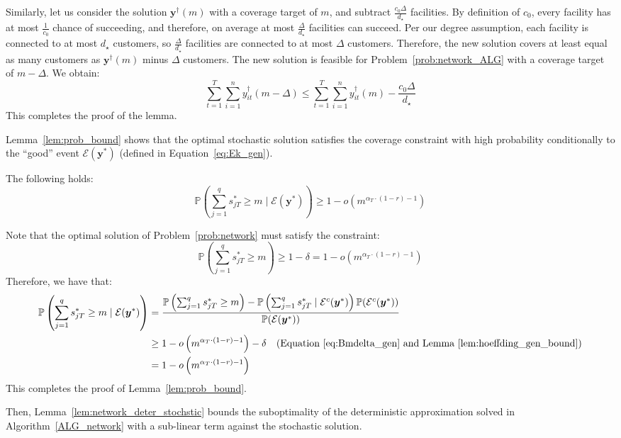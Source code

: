 \documentclass[nonblindrev]{informs3noheader}
\def\P{\mathbb{P}}
\def\calE{\mathcal{E}}
\def\by{\boldsymbol{y}}
\begin{document}
Similarly, let us consider the solution $\by^\dagger(m)$ with a coverage target of $m$, and subtract $\frac{c_0 \Delta}{d_\star}$ facilities. By definition of $c_0$, every facility has at most $\frac{1}{c_0}$ chance of succeeding, and therefore, on average at most $\frac{\Delta}{d_\star}$ facilities can succeed. Per our degree assumption, each facility is connected to at most $d_\star$ customers, so $\frac{\Delta}{d_\star}$ facilities are connected to at most $\Delta$ customers. Therefore, the new solution covers at least equal as many customers as $\by^\dagger(m)$ minus $\Delta$ customers. The new solution is feasible for Problem~\eqref{prob:network_ALG} with a coverage target of $m-\Delta$. We obtain:
\[\sum_{t=1}^T \sum_{i=1}^n y_{it}^\dagger(m-\Delta)\leq \sum_{t=1}^T \sum_{i=1}^n y_{it}^\dagger(m)-\frac{c_0 \Delta}{d_\star}\]
This completes the proof of the lemma.
\hfill\Halmos

Lemma~\ref{lem:prob_bound} shows that the optimal stochastic solution satisfies the coverage constraint with high probability conditionally to the ``good'' event $\calE(\by^*)$ (defined in Equation~\eqref{eq:Ek_gen}).

\begin{lemma}\label{lem:prob_bound}
   The following holds:
   \[\P\left(\sum_{j=1}^q s^*_{jT}\geq m\mid \calE(\by^*) \right)\geq 1-o\left(m^{\alpha_T\cdot(1-r)-1}\right)\]
\end{lemma}
Note that the optimal solution of Problem~\eqref{prob:network} must satisfy the constraint:
\begin{equation}
    \P\left(\sum_{j=1}^q s^*_{jT}\geq m\right)\geq 1-\delta = 1-o\left(m^{\alpha_T\cdot(1-r)-1}\right)\label{eq:Bmdelta_gen}
\end{equation}
Therefore, we have that:
\begin{align*}
    \P\left(\sum_{j=1}^q s^*_{jT} \geq m \mid \calE(\by^*)\right)
    &=\frac{\P\left(\sum_{j=1}^q s^*_{jT}\geq m\right)-\P\left(\sum_{j=1}^q s^*_{jT}\mid \calE^c(\by^*) \right)\P(\calE^c(\by^*))}{\P(\calE(\by^*))}\\
    &\geq1-o\left(m^{\alpha_T\cdot(1-r)-1}\right)-\delta\quad\text{(Equation~\eqref{eq:Bmdelta_gen} and Lemma~\ref{lem:hoeffding_gen_bound})}\\
    &=1-o\left(m^{\alpha_T\cdot(1-r)-1}\right)
\end{align*}
This completes the proof of Lemma~\ref{lem:prob_bound}.\hfill\Halmos

Then, Lemma~\ref{lem:network_deter_stochstic} bounds the suboptimality of the deterministic approximation solved in Algorithm~\ref{ALG_network} with a sub-linear term against the stochastic solution.
\end{document}
